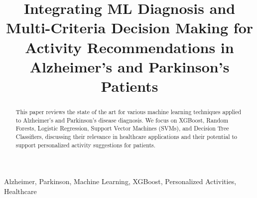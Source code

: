\documentclass[conference]{IEEEtran}
\begin{document}
\title{Integrating ML Diagnosis and Multi-Criteria Decision Making for Activity Recommendations in Alzheimer’s and Parkinson’s Patients}

\author{
\and
{}
\and
{}
\and
{}
\and
{}
}

\maketitle

\begin{abstract}
This paper reviews the state of the art for various machine learning techniques applied to Alzheimer’s and Parkinson’s disease diagnosis. We focus on XGBoost, Random Forests, Logistic Regression, Support Vector Machines (SVMs), and Decision Tree Classifiers, discussing their relevance in healthcare applications and their potential to support personalized activity suggestions for patients.
\end{abstract}

\begin{IEEEkeywords}
Alzheimer, Parkinson, Machine Learning, XGBoost, Personalized Activities, Healthcare
\end{IEEEkeywords}
\end{document}
